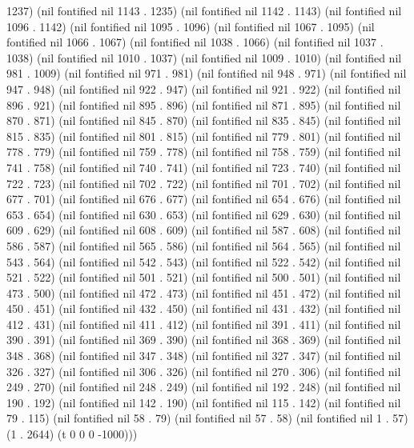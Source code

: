 1237) (nil fontified nil 1143 . 1235) (nil fontified nil 1142 . 1143) (nil fontified nil 1096 . 1142) (nil fontified nil 1095 . 1096) (nil fontified nil 1067 . 1095) (nil fontified nil 1066 . 1067) (nil fontified nil 1038 . 1066) (nil fontified nil 1037 . 1038) (nil fontified nil 1010 . 1037) (nil fontified nil 1009 . 1010) (nil fontified nil 981 . 1009) (nil fontified nil 971 . 981) (nil fontified nil 948 . 971) (nil fontified nil 947 . 948) (nil fontified nil 922 . 947) (nil fontified nil 921 . 922) (nil fontified nil 896 . 921) (nil fontified nil 895 . 896) (nil fontified nil 871 . 895) (nil fontified nil 870 . 871) (nil fontified nil 845 . 870) (nil fontified nil 835 . 845) (nil fontified nil 815 . 835) (nil fontified nil 801 . 815) (nil fontified nil 779 . 801) (nil fontified nil 778 . 779) (nil fontified nil 759 . 778) (nil fontified nil 758 . 759) (nil fontified nil 741 . 758) (nil fontified nil 740 . 741) (nil fontified nil 723 . 740) (nil fontified nil 722 . 723) (nil fontified nil 702 . 722) (nil fontified nil 701 . 702) (nil fontified nil 677 . 701) (nil fontified nil 676 . 677) (nil fontified nil 654 . 676) (nil fontified nil 653 . 654) (nil fontified nil 630 . 653) (nil fontified nil 629 . 630) (nil fontified nil 609 . 629) (nil fontified nil 608 . 609) (nil fontified nil 587 . 608) (nil fontified nil 586 . 587) (nil fontified nil 565 . 586) (nil fontified nil 564 . 565) (nil fontified nil 543 . 564) (nil fontified nil 542 . 543) (nil fontified nil 522 . 542) (nil fontified nil 521 . 522) (nil fontified nil 501 . 521) (nil fontified nil 500 . 501) (nil fontified nil 473 . 500) (nil fontified nil 472 . 473) (nil fontified nil 451 . 472) (nil fontified nil 450 . 451) (nil fontified nil 432 . 450) (nil fontified nil 431 . 432) (nil fontified nil 412 . 431) (nil fontified nil 411 . 412) (nil fontified nil 391 . 411) (nil fontified nil 390 . 391) (nil fontified nil 369 . 390) (nil fontified nil 368 . 369) (nil fontified nil 348 . 368) (nil fontified nil 347 . 348) (nil fontified nil 327 . 347) (nil fontified nil 326 . 327) (nil fontified nil 306 . 326) (nil fontified nil 270 . 306) (nil fontified nil 249 . 270) (nil fontified nil 248 . 249) (nil fontified nil 192 . 248) (nil fontified nil 190 . 192) (nil fontified nil 142 . 190) (nil fontified nil 115 . 142) (nil fontified nil 79 . 115) (nil fontified nil 58 . 79) (nil fontified nil 57 . 58) (nil fontified nil 1 . 57) (1 . 2644) (t 0 0 0 -1000)))
